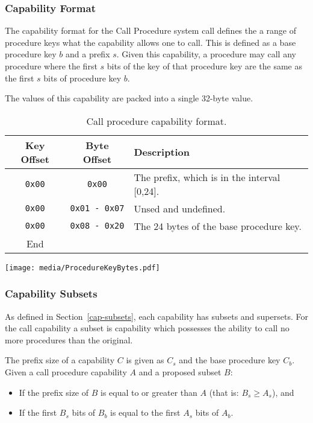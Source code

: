 \documentclass[english,a4paper]{article}
\let\oldparagraph\subsubsection
\renewcommand{\subsubsection}[1]{\oldparagraph{#1}\mbox{}}
\begin{document}
\subsubsection{Capability Format}
The capability format for the Call Procedure system call defines the a range of
procedure keys what the capability allows one to call. This is defined as a base
procedure key $b$ and a prefix $s$. Given this capability, a procedure may call
any procedure where the first $s$ bits of the key of that procedure key are the
same as the first $s$ bits of procedure key $b$.

The values of this capability are packed into a single 32-byte value.

\begin{table}[H]
  \caption{Call procedure capability format.}
  \centering{}%
  \begin{tabularx}{\textwidth}{c|c|X}
    \hline
    Key Offset & Byte Offset & Description \\
    \hline
    \hline
    \texttt{0x00} & \texttt{0x00} & The prefix, which is in the interval [0,24]. \\
    \texttt{0x00} & \texttt{0x01 - 0x07} & Unsed and undefined. \\
    \texttt{0x00} & \texttt{0x08 - 0x20} & The 24 bytes of the base procedure key. \\
    \hline
    End &   \\
    \hline
  \end{tabularx}
\end{table}

\texttt{[image: media/ProcedureKeyBytes.pdf]}

\subsubsection{Capability Subsets}
As defined in Section~\ref{cap-subsets}, each capability has subsets and
supersets. For the call capability a subset is capability which possesses the
ability to call no more procedures than the original.

The prefix size of a capability $C$ is given as $C_s$ and the base procedure key
$C_b$. Given a call procedure capability $A$ and a proposed subset $B$:
\begin{itemize}
  \item If the prefix size of $B$ is equal to or greater than $A$ (that is: $B_s
  \geq A_s$), and
  \item If the first $B_s$ bits of $B_b$ is equal to the first $A_s$ bits of
  $A_b$.
\end{itemize}
\end{document}
